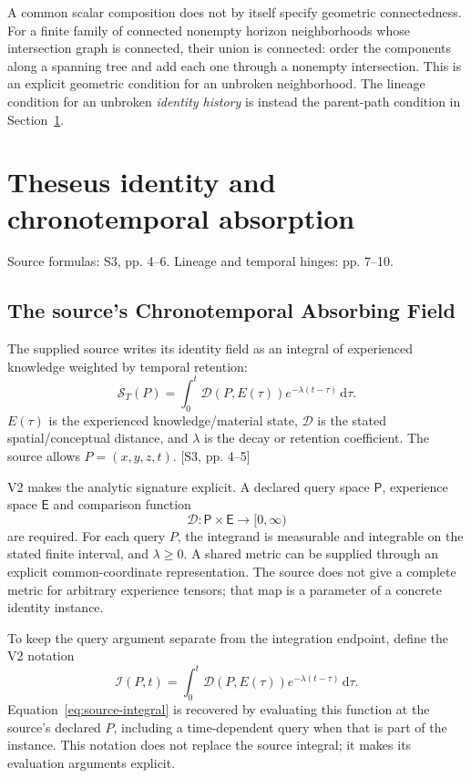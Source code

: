 \documentclass[11pt,a4paper]{article}
\numberwithin{equation}{section}
\newcommand{\newsec}[1]{\clearpage\section{#1}}
\newcommand{\src}[2]{{\sffamily\small\color{slate}[#1, #2]}}
\newcommand{\origin}[1]{{\sffamily\small\color{slate}#1}\par\vspace{3pt}}
\newcommand{\dd}{\mathrm d}
\begin{document}
A common scalar composition does not by itself specify geometric connectedness. For a finite family of connected nonempty horizon neighborhoods whose intersection graph is connected, their union is connected: order the components along a spanning tree and add each one through a nonempty intersection. This is an explicit geometric condition for an unbroken neighborhood. The lineage condition for an unbroken \emph{identity history} is instead the parent-path condition in Section~\ref{sec:theseus}.

\newsec{Theseus identity and chronotemporal absorption}
\label{sec:theseus}
\origin{Source formulas: S3, pp. 4--6. Lineage and temporal hinges: pp. 7--10.}

\subsection{The source's Chronotemporal Absorbing Field}
The supplied source writes its identity field as an integral of experienced knowledge weighted by temporal retention:
\begin{equation}
\mathcal S_T(P)=\int_0^t\mathcal D(P,E(\tau))e^{-\lambda(t-\tau)}\,\dd\tau.
\label{eq:source-integral}
\end{equation}
$E(\tau)$ is the experienced knowledge/material state, $\mathcal D$ is the stated spatial/conceptual distance, and $\lambda$ is the decay or retention coefficient. The source allows $P=(x,y,z,t)$. \src{S3}{pp. 4--5}

V2 makes the analytic signature explicit. A declared query space $\mathsf P$, experience space $\mathsf E$ and comparison function
\begin{equation}
\mathcal D:\mathsf P\times\mathsf E\longrightarrow[0,\infty)
\end{equation}
are required. For each query $P$, the integrand is measurable and integrable on the stated finite interval, and $\lambda\ge0$. A shared metric can be supplied through an explicit common-coordinate representation. The source does not give a complete metric for arbitrary experience tensors; that map is a parameter of a concrete identity instance.

To keep the query argument separate from the integration endpoint, define the V2 notation
\begin{equation}
\mathcal I(P,t)=\int_0^t\mathcal D(P,E(\tau))e^{-\lambda(t-\tau)}\,\dd\tau.
\end{equation}
Equation~\eqref{eq:source-integral} is recovered by evaluating this function at the source's declared $P$, including a time-dependent query when that is part of the instance. This notation does not replace the source integral; it makes its evaluation arguments explicit.
\end{document}
